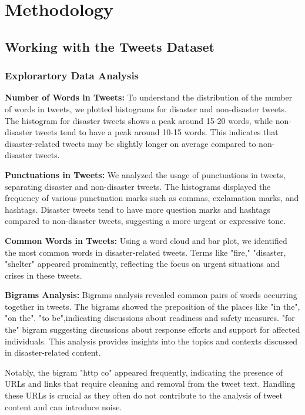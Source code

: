 \chapter{Methodology}
\label{ch:method} %


\section{Working with the Tweets Dataset}

\subsection{Explorartory Data Analysis}

\textbf{Number of Words in Tweets:}
To understand the distribution of the number of words in tweets, we plotted histograms for disaster and non-disaster tweets. The histogram for disaster tweets shows a peak around 15-20 words, while non-disaster tweets tend to have a peak around 10-15 words. This indicates that disaster-related tweets may be slightly longer on average compared to non-disaster tweets.

\textbf{Punctuations in Tweets:}
We analyzed the usage of punctuations in tweets, separating disaster and non-disaster tweets. The histograms displayed the frequency of various punctuation marks such as commas, exclamation marks, and hashtags. Disaster tweets tend to have more question marks and hashtags compared to non-disaster tweets, suggesting a more urgent or expressive tone.

\textbf{Common Words in Tweets:}
Using a word cloud and bar plot, we identified the most common words in disaster-related tweets. Terms like "fire," "disaster, "shelter" appeared prominently, reflecting the focus on urgent situations and crises in these tweets.

\textbf{Bigrams Analysis:}
Bigrams analysis revealed common pairs of words occurring together in tweets. The bigrams showed the preposition of the places like "in the", "on the".
"to be",indicating discussions about readiness and safety measures.
"for the" bigram suggesting discussions about response efforts and support for affected individuals. This analysis provides insights into the topics and contexts discussed in disaster-related content.

Notably, the bigram "http co" appeared frequently, indicating the presence of URLs and links that require cleaning and removal from the tweet text. Handling these URLs is crucial as they often do not contribute to the analysis of tweet content and can introduce noise.


